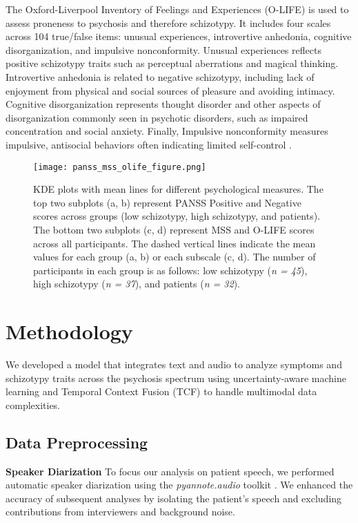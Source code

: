 \documentclass[9pt,a4paper]{rho-class/rho}
\begin{document}
The Oxford-Liverpool Inventory of Feelings and Experiences (O-LIFE) \cite{mason1995new} is used to assess proneness to psychosis and therefore schizotypy. It includes four scales across 104 true/false items: unusual experiences, introvertive anhedonia, cognitive disorganization, and impulsive nonconformity. Unusual experiences reflects positive schizotypy traits such as perceptual aberrations and magical thinking. Introvertive anhedonia is related to negative schizotypy, including lack of enjoyment from physical and social sources of pleasure and avoiding intimacy. Cognitive disorganization represents thought disorder and other aspects of disorganization commonly seen in psychotic disorders, such as impaired concentration and social anxiety. Finally, Impulsive nonconformity measures impulsive, antisocial behaviors often indicating limited self-control \cite{mason2006oxford}.




\begin{figure*}[ht!]
    \centering
    \texttt{[image: panss\_mss\_olife\_figure.png]}
    \caption{KDE plots with mean lines for different psychological measures. The top two subplots (a, b) represent PANSS Positive and Negative scores across groups (low schizotypy, high schizotypy, and patients). The bottom two subplots (c, d) represent MSS and O-LIFE scores across all participants. The dashed vertical lines indicate the mean values for each group (a, b) or each subscale (c, d). The number of participants in each group is as follows: low schizotypy (\textit{n = 45}), high schizotypy (\textit{n = 37}), and patients (\textit{n = 32}).}
    \label{fig:panss_mss_olife}
\end{figure*}



\section{Methodology}

We developed a model that integrates text and audio to analyze symptoms and schizotypy traits across the psychosis spectrum using uncertainty-aware machine learning and Temporal Context Fusion (TCF) to handle multimodal data complexities.

\subsection{Data Preprocessing}

\textbf{Speaker Diarization} To focus our analysis on patient speech, we performed automatic speaker diarization using the \textit{pyannote.audio} toolkit \cite{bredin2021end}. We enhanced the accuracy of subsequent analyses by isolating the patient's speech and excluding contributions from interviewers and background noise.
\end{document}
